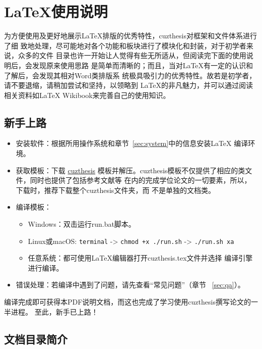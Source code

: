 \chapter{\LaTeX{}使用说明}\label{chap:guide}

为方便使用及更好地展示\LaTeX{}排版的优秀特性，cuzthesis对框架和文件体系进行了细
致地处理，尽可能地对各个功能和板块进行了模块化和封装，对于初学者来说，众多的文件
目录也许一开始让人觉得有些无所适从，但阅读完下面的使用说明后，会发现原来使用思路
是简单而清晰的；而且，当对\LaTeX{}有一定的认识和了解后，会发现其相对Word类排版系
统极具吸引力的优秀特性。故若是初学者，请不要退缩，请稍加尝试和坚持，以领略到
\LaTeX{}的非凡魅力，并可以通过阅读相关资料如\LaTeX{}
Wikibook\citep{wikibook2014latex}来完善自己的使用知识。

\section{新手上路}\label{sec:newbie}

\begin{itemize}
    \item 安装软件：根据所用操作系统和章节~\ref{sec:system}中的信息安装\LaTeX{}
    编译环境。
    \item 获取模板：下载 \href{https://github.com/xiehao/CUZThesis}{cuzthesis}
    模板并解压。cuzthesis模板不仅提供了相应的类文件，同时也提供了包括参考文献等
    在内的完成学位论文的一切要素，所以，下载时，推荐下载整个cuzthesis文件夹，而
    不是单独的文档类。
    \item 编译模板：
        \begin{itemize}
            \item Windows：双击运行run.bat脚本。
            \item Linux或macOS: {\small \verb|terminal| -> \verb|chmod +x ./run.sh| -> \verb|./run.sh xa|}
            \item 任意系统：都可使用\LaTeX{}编辑器打开cuzthesis.tex文件并选择
            编译引擎进行编译。
        \end{itemize}
    \item 错误处理：若编译中遇到了问题，请先查看“常见问题”（章节
    ~\ref{sec:qa}）。
\end{itemize}

编译完成即可获得本PDF说明文档，而这也完成了学习使用cuzthesis撰写论文的一半进程。
至此，新手已上路！

\section{文档目录简介}\label{sec:directory}

